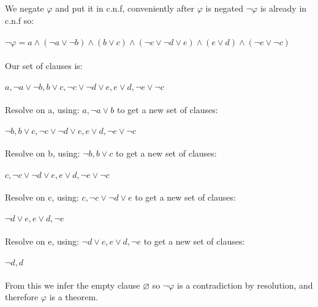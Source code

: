 \documentclass[]{article}
\begin{document}
\subsection{}
We negate $\varphi$ and put it in c.n.f, conveniently after $\varphi$ is negated $\neg \varphi$ is already in c.n.f so:
\\
\\
$\neg \varphi = a \wedge (\neg a \vee \neg b) \wedge (b \vee c) \wedge (\neg c \vee \neg d \vee e) \wedge (e \vee d) \wedge (\neg e \vee \neg c)$
\\
\\
Our set of clauses is:
\\
\\
$a, \neg a \vee \neg b, b \vee c, \neg c \vee \neg d \vee e, e \vee d, \neg e \vee \neg c$
\\
\\
Resolve on a, using: $a, \neg a \vee b$ to get a new set of clauses:
\\
\\
$\neg b, b \vee c, \neg c \vee \neg d \vee e, e \vee d, \neg e \vee \neg c$
\\
\\
Resolve on b, using: $\neg b, b \vee c$ to get a new set of clauses:
\\
\\
$c, \neg c \vee \neg d \vee e, e \vee d, \neg e \vee \neg c$
\\
\\
Resolve on c, using: $c, \neg c \vee \neg d \vee e$ to get a new set of clauses:
\\
\\
$\neg d \vee e, e \vee d, \neg e$
\\
\\
Resolve on e, using: $\neg d \vee e, e \vee d, \neg e$ to get a new set of clauses:
\\
\\
$\neg d, d$
\\
\\
From this we infer the empty clause $\varnothing$ so $\neg \varphi$ is a contradiction by resolution, and therefore $\varphi$ is a theorem.
\end{document}
